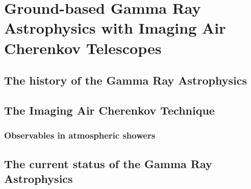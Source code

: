 
\chapter{Ground-based Gamma Ray Astrophysics with Imaging Air 
  Cherenkov Telescopes}
\label{chapter:iacts}

\gsourcesfig

\gsnumbersfig

\section{The history of the Gamma Ray Astrophysics}

\section{The Imaging Air Cherenkov Technique}

\subsection{Observables in atmospheric showers}

\section{The current status of the Gamma Ray Astrophysics}

\endinput
%

